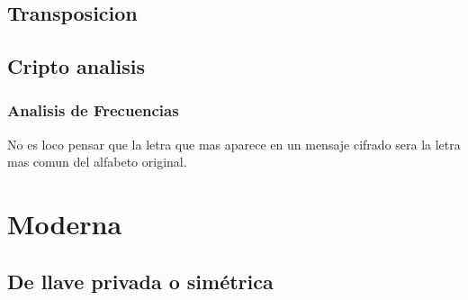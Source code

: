 \documentclass[12pt, fleqn]{report}                             %
\theoremstyle{break}                                            %
\begin{document}
        
    \chapter{Transposicion}

    \chapter{Cripto analisis}


        \clearpage
        \section{Analisis de Frecuencias}

            No es loco pensar que la letra que mas aparece en un mensaje cifrado sera la letra mas comun
            del alfabeto original.


            

\part{Moderna}


    \chapter{De llave privada o simétrica}
\end{document}
